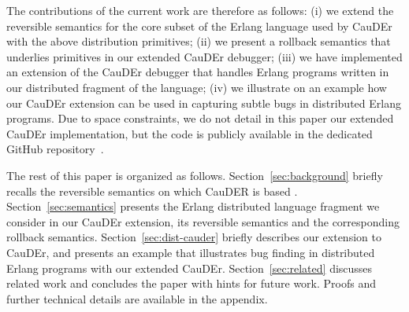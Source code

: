 \documentclass[runningheads]{llncs}
\begin{document}
The contributions of the current work are therefore as follows: 
(i) we extend the reversible semantics for the core subset of the Erlang language used by CauDEr with the above distribution primitives;
(ii) we present a rollback semantics that underlies primitives in our extended CauDEr debugger;
(iii) we have implemented an extension of the CauDEr debugger that handles Erlang programs written in our distributed fragment of the language;
(iv) we illustrate on an example how our CauDEr extension can be used in capturing subtle bugs in distributed Erlang programs.
Due to space constraints, we do not detail in this paper our extended CauDEr implementation, but the code is publicly available in the dedicated GitHub repository~\cite{DistCauder}.

The rest of this paper is organized as follows.
Section~\ref{sec:background} briefly recalls the reversible semantics on which CauDER is based \cite{LaneseNPV18}.
Section~\ref{sec:semantics} presents the Erlang distributed language fragment we consider in our CauDEr extension, 
its reversible semantics and the corresponding rollback semantics.
Section~\ref{sec:dist-cauder} briefly describes our extension to CauDEr,
and presents an example that illustrates bug finding in distributed Erlang programs with our extended CauDEr.
Section~\ref{sec:related} discusses related work and concludes the paper with hints for future work.
Proofs and further technical details are available in the appendix.
\end{document}
